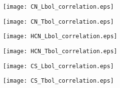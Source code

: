 \documentclass{aa}
\begin{document}
\begin{appendix}
\begin{figure*}
\centering 
\begin{subfigure}{.45\textwidth} 
\label{model1} 
\centering
\texttt{[image: CN\_Lbol\_correlation.eps]} 
\end{subfigure}
\begin{subfigure}{.45\textwidth} 
\label{model2} 
\centering
\texttt{[image: CN\_Tbol\_correlation.eps]} 
\end{subfigure}
\begin{subfigure}{.45\textwidth} 
\label{model3} 
\centering
\texttt{[image: HCN\_Lbol\_correlation.eps]} 
\end{subfigure}
\begin{subfigure}{.45\textwidth} 
\label{model4} 
\centering
\texttt{[image: HCN\_Tbol\_correlation.eps]} 
\end{subfigure}
\begin{subfigure}{.45\textwidth} \label{model5} 
\centering
\texttt{[image: CS\_Lbol\_correlation.eps]} 
\end{subfigure}
\begin{subfigure}{.45\textwidth} 
\label{model6} 
\centering
\texttt{[image: CS\_Tbol\_correlation.eps]} 
\end{subfigure}
\caption{\label{RADEX_models}} 
\end{figure*}

\end{appendix}
\end{document}
